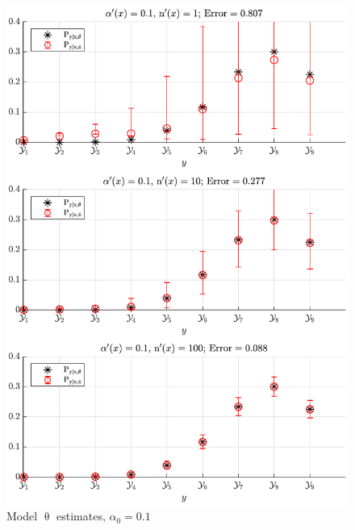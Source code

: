 \documentclass[12pt]{report}
\begin{document}
\begin{figure}
\centering
\includegraphics[width=0.7\linewidth]{P_yx_error_a0_0_1.pdf}
\caption{Model $\uptheta$ estimates, $\alpha_0 = 0.1$}
\label{fig:P_yx_error_a0_0_1}
\end{figure}
\end{document}
